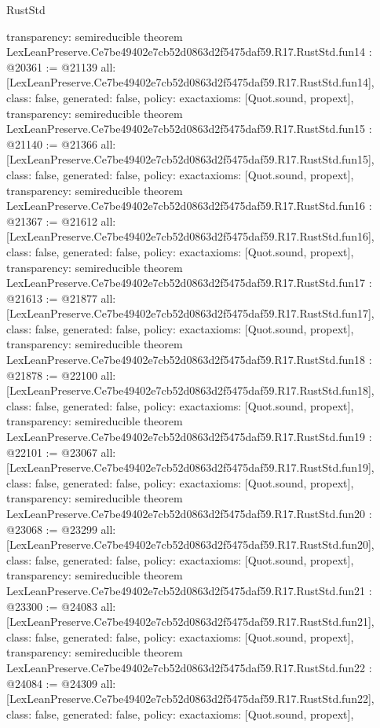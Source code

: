 \begin{lexlean}{RustStd}
\begin{coremodule}
{  transparency: semireducible
}
theorem LexLeanPreserve.Ce7be49402e7cb52d0863d2f5475daf59.R17.RustStd.fun14 : @20361 := @21139 {
  all: [LexLeanPreserve.Ce7be49402e7cb52d0863d2f5475daf59.R17.RustStd.fun14],
  class: false,
  generated: false,
  policy: exact{axioms: [Quot.sound, propext]},
  transparency: semireducible
}
theorem LexLeanPreserve.Ce7be49402e7cb52d0863d2f5475daf59.R17.RustStd.fun15 : @21140 := @21366 {
  all: [LexLeanPreserve.Ce7be49402e7cb52d0863d2f5475daf59.R17.RustStd.fun15],
  class: false,
  generated: false,
  policy: exact{axioms: [Quot.sound, propext]},
  transparency: semireducible
}
theorem LexLeanPreserve.Ce7be49402e7cb52d0863d2f5475daf59.R17.RustStd.fun16 : @21367 := @21612 {
  all: [LexLeanPreserve.Ce7be49402e7cb52d0863d2f5475daf59.R17.RustStd.fun16],
  class: false,
  generated: false,
  policy: exact{axioms: [Quot.sound, propext]},
  transparency: semireducible
}
theorem LexLeanPreserve.Ce7be49402e7cb52d0863d2f5475daf59.R17.RustStd.fun17 : @21613 := @21877 {
  all: [LexLeanPreserve.Ce7be49402e7cb52d0863d2f5475daf59.R17.RustStd.fun17],
  class: false,
  generated: false,
  policy: exact{axioms: [Quot.sound, propext]},
  transparency: semireducible
}
theorem LexLeanPreserve.Ce7be49402e7cb52d0863d2f5475daf59.R17.RustStd.fun18 : @21878 := @22100 {
  all: [LexLeanPreserve.Ce7be49402e7cb52d0863d2f5475daf59.R17.RustStd.fun18],
  class: false,
  generated: false,
  policy: exact{axioms: [Quot.sound, propext]},
  transparency: semireducible
}
theorem LexLeanPreserve.Ce7be49402e7cb52d0863d2f5475daf59.R17.RustStd.fun19 : @22101 := @23067 {
  all: [LexLeanPreserve.Ce7be49402e7cb52d0863d2f5475daf59.R17.RustStd.fun19],
  class: false,
  generated: false,
  policy: exact{axioms: [Quot.sound, propext]},
  transparency: semireducible
}
theorem LexLeanPreserve.Ce7be49402e7cb52d0863d2f5475daf59.R17.RustStd.fun20 : @23068 := @23299 {
  all: [LexLeanPreserve.Ce7be49402e7cb52d0863d2f5475daf59.R17.RustStd.fun20],
  class: false,
  generated: false,
  policy: exact{axioms: [Quot.sound, propext]},
  transparency: semireducible
}
theorem LexLeanPreserve.Ce7be49402e7cb52d0863d2f5475daf59.R17.RustStd.fun21 : @23300 := @24083 {
  all: [LexLeanPreserve.Ce7be49402e7cb52d0863d2f5475daf59.R17.RustStd.fun21],
  class: false,
  generated: false,
  policy: exact{axioms: [Quot.sound, propext]},
  transparency: semireducible
}
theorem LexLeanPreserve.Ce7be49402e7cb52d0863d2f5475daf59.R17.RustStd.fun22 : @24084 := @24309 {
  all: [LexLeanPreserve.Ce7be49402e7cb52d0863d2f5475daf59.R17.RustStd.fun22],
  class: false,
  generated: false,
  policy: exact{axioms: [Quot.sound, propext]},
}
\end{coremodule}
\end{lexlean}

